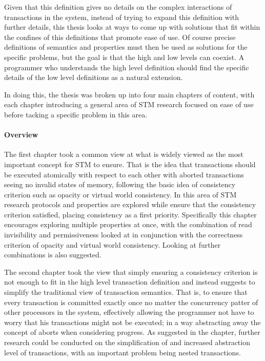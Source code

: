 Given that this definition gives no details on the complex interactions of transactions in
the system, instead of trying to expand this definition with further details, this
thesis looks at ways to come up with solutions that fit within the confines of this
definitions that promote ease of use.
Of course precise definitions of semantics and properties must then be used as solutions
for the specific problems, but the goal is that the high and low levels can coexist.
A programmer who
understands the high level definition should find the specific details of the low level definitions as a
natural extension.


In doing this, the thesis was broken up into four main chapters of content, with each chapter
introducing a general area of STM research 
focused on ease of use
before tacking a specific problem in this area.

\paragraph{Overview}
The first chapter took a common view at what is widely viewed as the most important concept
for STM to ensure.
That is the idea that transactions should be executed atomically with respect to each other
with aborted transactions seeing no invalid states of memory, following the basic
idea of consistency criterion such as opacity or virtual world consistency.
In this area of STM research protocols and properties are explored while
ensure that the consistency criterion satisfied, placing consistency as a first priority.
Specifically this chapter encourages exploring multiple properties at once, with
the combination of read invisibility and permissiveness looked at in conjunction
with the correctness criterion of opacity and virtual world consistency.
Looking at further combinations is also suggested.

The second chapter took the view that simply ensuring a consistency criterion
is not enough to fit in the high level transaction definition and instead
suggests to simplify the traditional view of transaction semantics.
That is, to ensure that every transaction is committed exactly once no matter
the concurrency patter of other processors in the system, effectively allowing
the programmer not have to worry that his transactions might not be executed;
in a way abstracting away the concept of aborts when considering progress.
As suggested in the chapter, further research could be conducted on the simplification
of and increased abstraction level of transactions, with an important problem being nested transactions.

